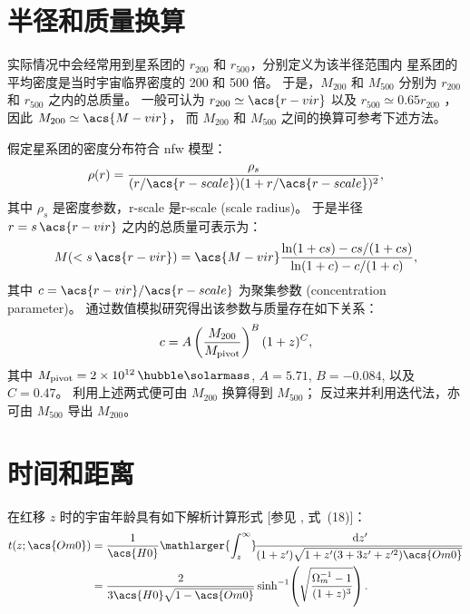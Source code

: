 \section{半径和质量换算}

实际情况中会经常用到星系团的 $r_{200}$ 和 $r_{500}$，分别定义为该半径范围内
星系团的平均密度是当时宇宙临界密度的 200 和 500 倍。
于是，$M_{200}$ 和 $M_{500}$ 分别为 $r_{200}$ 和 $r_{500}$ 之内的总质量。
一般可认为 $r_{200} \simeq \acs{r-vir}$
以及 $r_{500} \simeq 0.65 r_{200}$ \cite{ettori2009}，
因此 $M_{200} \simeq \acs{M-vir}$，
而 $M_{200}$ 和 $M_{500}$ 之间的换算可参考下述方法。

假定星系团的密度分布符合 \ac{nfw} 模型\cite{navarro1997}：
\begin{equation}
  \label{eq:nfw}
  \rho(r) = \frac{\rho_s}{
    (r / \acs{r-scale}) (1 + r / \acs{r-scale})^2} ,
\end{equation}
其中 $\rho_s$ 是密度参数，\acs{r-scale} 是\acl{r-scale} (scale radius)。
于是半径 $r = s \,\acs{r-vir}$ 之内的总质量可表示为\cite{lokas2001}：
\begin{equation}
  \label{eq:mass-r}
  M(< s \,\acs{r-vir}) = \acs{M-vir}
    \frac{\ln(1 + c s) - c s / (1 + c s)}{\ln(1 + c) - c / (1 + c)} ,
\end{equation}
其中 $c = \acs{r-vir} / \acs{r-scale}$ 为聚集参数 (concentration parameter)。
 通过数值模拟研究得出该参数与质量存在如下关系：
\begin{equation}
  \label{eq:mass-c}
  c = A \left( \frac{M_{200}}{M_{\mathrm{pivot}}} \right)^B (1+z)^C ,
\end{equation}
其中 $M_{\R{pivot}} = \SI{2e12}{\per\hubble\solarmass}$,
$A = 5.71$, $B = -0.084$, 以及 $C = 0.47$。
利用上述两式便可由 $M_{200}$ 换算得到 $M_{500}$；
反过来并利用迭代法，亦可由 $M_{500}$ 导出 $M_{200}$。


\section{时间和距离}

在红移 $z$ 时的宇宙年龄具有如下解析计算形式
[参见 , 式~(18)]：
\begin{align}
  \label{eq:universe-age}
  t(z; \acs{Om0})
    & = \frac{1}{\acs{H0}} \mathlarger{\int_z^{\infty}}
      \!\frac{\D{z'}}{(1+z')\sqrt{1 + z' (3+3z'+z'^2) \acs{Om0}}}
      \nonumber \\
    & = \frac{2}{3 \acs{H0} \sqrt{1-\acs{Om0}}} \sinh^{-1}
      \!\left( \sqrt{\frac{\Omega_m^{-1} - 1}{(1+z)^3}} \right).
\end{align}

